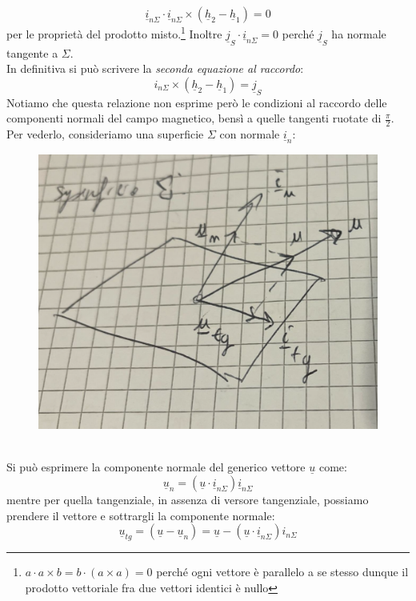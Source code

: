 \documentclass{book}
\begin{document}
        \begin{equation}
            \underline{i}_{n\Sigma} \cdot \underline{i}_{n\Sigma} \times (\underline{h}_{2}-\underline{h}_{1}) = 0
        \end{equation}
        per le proprietà del prodotto misto.\footnote{$a \cdot a \times b = b \cdot (a \times a) = 0$ perché ogni vettore è parallelo a se stesso dunque il prodotto vettoriale fra due vettori identici è nullo} Inoltre $\underline{j}_{S} \cdot \underline{i}_{n \Sigma} = 0$ perché $\underline{j}_{S}$ ha normale tangente a $\Sigma$.\\
        In definitiva si può scrivere la \textit{seconda equazione al raccordo}:
        \begin{equation}
            \label{eqn:equazione_raccordo2}
            i_{n \Sigma} \times (\underline{h}_{2}-\underline{h}_{1}) = \underline{j}_{S}
        \end{equation}
        Notiamo che questa relazione non esprime però le condizioni al raccordo delle componenti normali del campo magnetico, bensì a quelle tangenti ruotate di $\frac{\pi}{2}$. Per vederlo, consideriamo una superficie $\Sigma$ con normale $\underline{i}_{n}$:
        \begin{figure}[h!]
            \centering
            \includegraphics[width=0.60\linewidth]{img/Chapter_one/Chapt1img7.png}
        \end{figure} \\
        Si può esprimere la componente normale del generico vettore $\underline{u}$ come:
        \begin{equation}
            \underline{u}_{n} = (\underline{u} \cdot \underline{i}_{n \Sigma}) \underline{i}_{n \Sigma}
        \end{equation}
        mentre per quella tangenziale, in assenza di versore tangenziale, possiamo prendere il vettore e sottrargli la componente normale:
        \begin{equation}
            \underline{u}_{tg} = (\underline{u}-\underline{u}_{n}) = \underline{u} - (\underline{u} \cdot \underline{i}_{n \Sigma}) i_{n \Sigma}
        \end{equation}
\end{document}
